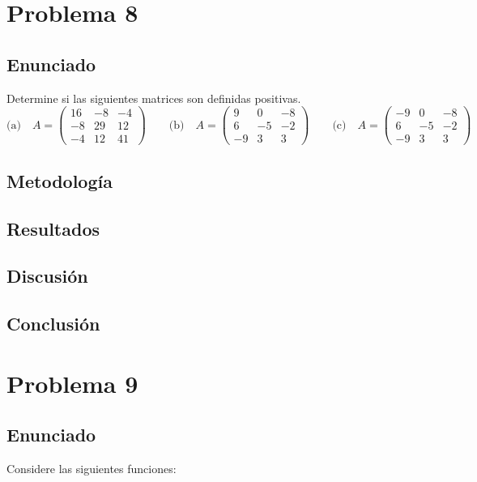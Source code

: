 \documentclass{article}
\begin{document}
\section{Problema 8}

\subsection{Enunciado}
Determine si las siguientes matrices son definidas positivas.
\[
\text{(a)}\quad
A=\begin{pmatrix}
16 & -8 & -4\\
-8 & 29 & 12\\
-4 & 12 & 41
\end{pmatrix}
\qquad
\text{(b)}\quad
A=\begin{pmatrix}
9 & 0 & -8\\
6 & -5 & -2\\
-9 & 3 & 3
\end{pmatrix}
\qquad
\text{(c)}\quad
A=\begin{pmatrix}
-9 & 0 & -8\\
6 & -5 & -2\\
-9 & 3 & 3
\end{pmatrix}
\]

\subsection{Metodología}

\subsection{Resultados}
\setcounter{equation}{0}

\subsection{Discusión}

\subsection{Conclusión}

\section{Problema 9}

\subsection{Enunciado}
Considere las siguientes funciones:
\end{document}

